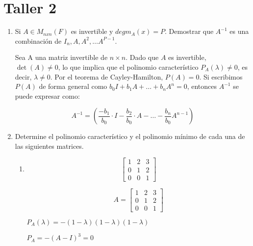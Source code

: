 \documentclass{report}
\begin{document}

    \section*{Taller 2}
    
    \begin{enumerate}
        \item Si $A \in M_{nxn}(F)$ es invertible y $deg m_A(x) = P$. Demostrar que $A^{-1}$ es una combinación de $I_n, A, A^2, \dots A^{P-1}$.

        Sea $\mathrm{A}$ una matriz invertible de $n \times n$. Dado que $A$ es invertible, $\det(A) \neq 0$, lo que implica que el polinomio característico $P_{A}(\lambda) \neq 0$, es decir, $\lambda \neq 0$. Por el teorema de Cayley-Hamilton, $P(A)=0$. Si escribimos $P(A)$ de forma general como $b_{0} I + b_{1} A + \ldots + b_{n} A^{n} = 0$, entonces $A^{-1}$ se puede expresar como:

        $$
        A^{-1} = \left(\frac{-b_{1}}{b_{0}} \cdot I - \frac{b_{2}}{b_{0}} \cdot A - \ldots - \frac{b_{n}}{b_{0}} A^{n-1}\right)
        $$

        \item Determine el polinomio característico y el polinomio mínimo de cada una de las siguientes matrices.

        \begin{enumerate}
            \item $$\begin{bmatrix}
                1 & 2 & 3\\
                0 & 1 & 2\\
                0 & 0 & 1
            \end{bmatrix}$$

            $$
            A = \begin{bmatrix}
            1 & 2 & 3 \\
            0 & 1 & 2 \\
            0 & 0 & 1
            \end{bmatrix}
            $$

            $P_{A}(\lambda) = -(1-\lambda)(1-\lambda)(1-\lambda)$

            $P_{A} = -(A-I)^{3} = 0$


\end{enumerate}
\end{enumerate}
\end{document}
